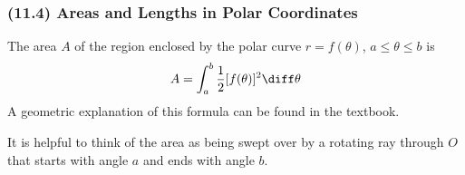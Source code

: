 \begin{frame}
\frametitle{(11.4)  Areas and Lengths in Polar Coordinates}
The area $A$ of the region enclosed by the polar curve $r = f(\theta )$, $a\leq \theta \leq b$ is
\[
A = \int_a^b \frac{1}{2}[f(\theta )]^2\diff \theta
\]
A geometric explanation of this formula can be found in the textbook.

It is helpful to think of the area as being swept over by a rotating ray through $O$ that starts with angle $a$ and ends with angle $b$.
\end{frame}

